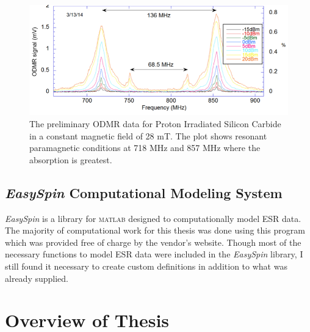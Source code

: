 \documentclass[oneside, astronomy, noacknowlegments]{BYUPhys}
\begin{document}
\begin{figure}
    \centerline{\includegraphics{prelim_odmr_fig}}
    \caption[Preliminary ODMR data]{\label{fig:PrelimODMR}
     The preliminary ODMR data for Proton Irradiated Silicon Carbide in a constant magnetic field of 28 mT. The plot shows resonant paramagnetic conditions at 718 MHz and 857 MHz where the absorption is greatest. }
\end{figure}

\subsection{\textit{EasySpin} Computational Modeling System}

\textit{EasySpin} \cite{RefWorks:doc:589299fbe4b0dec22aee3bd8} is a library for \textsc{matlab} designed to computationally model ESR data. The majority of computational work for this thesis was done using this program which was provided free of charge by the vendor's website. Though most of the necessary functions to model ESR data were included in the \textit{EasySpin} library, I still found it necessary to create custom definitions in addition to what was already supplied.

\section{Overview of Thesis}
\end{document}
